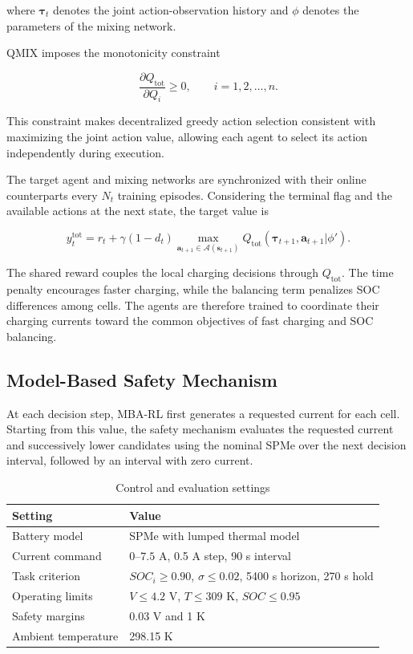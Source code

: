 where $\boldsymbol{\tau}_t$ denotes the joint action-observation history and $\phi$ denotes the parameters of the mixing network.

QMIX imposes the monotonicity constraint

\begin{equation}
\label{QMIX_constraints}
\frac{\partial Q_{\mathrm{tot}}}{\partial Q_i}
\geq 0,
\qquad
i=1,2,\ldots,n.
\end{equation}

This constraint makes decentralized greedy action selection consistent with maximizing the joint action value, allowing each agent to select its action independently during execution.

The target agent and mixing networks are synchronized with their online counterparts every $N_t$ training episodes. Considering the terminal flag and the available actions at the next state, the target value is

\begin{equation}
\label{target Q}
y_t^{\mathrm{tot}}
=
r_t
+
\gamma(1-d_t)
\max_{\mathbf{a}_{t+1}\in\mathcal{A}(\mathbf{s}_{t+1})}
Q_{\mathrm{tot}}
(
\boldsymbol{\tau}_{t+1},
\mathbf{a}_{t+1}
|\phi'
).
\end{equation}

The shared reward couples the local charging decisions through $Q_{\mathrm{tot}}$. The time penalty encourages faster charging, while the balancing term penalizes SOC differences among cells. The agents are therefore trained to coordinate their charging currents toward the common objectives of fast charging and SOC balancing.

\subsection{Model-Based Safety Mechanism}

At each decision step, MBA-RL first generates a requested current for each cell. Starting from this value, the safety mechanism evaluates the requested current and successively lower candidates using the nominal SPMe over the next decision interval, followed by an interval with zero current.

\begin{table}[!t]
\centering
\caption{Control and evaluation settings}
\label{tab:experimental_settings}
\scriptsize
\setlength{\tabcolsep}{3pt}
\begin{tabular}{@{}p{}p{}@{}}
\toprule
Setting & Value \\
\midrule
Battery model & SPMe with lumped thermal model \\
Current command & $0$--$7.5$ A, 0.5 A step, 90 s interval \\
Task criterion & $SOC_i\geq0.90$, $\sigma\leq0.02$, 5400 s horizon, 270 s hold \\
Operating limits & $V\leq4.2$ V, $T\leq309$ K, $SOC\leq0.95$ \\
Safety margins & 0.03 V and 1 K \\
Ambient temperature & 298.15 K \\
\bottomrule
\end{tabular}
\end{table}

